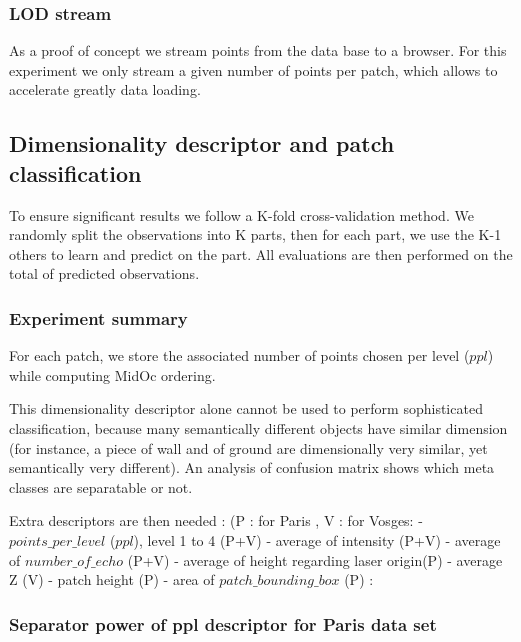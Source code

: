				
		\subsubsection{LOD stream}
			As a proof of concept we stream points from the data base to a browser\cite{IGN2014a}.
			For this experiment we only stream a given number of points per patch, which allows to accelerate greatly data loading. 
			
	\subsection{Dimensionality descriptor and patch classification}
			To ensure significant results we follow a K-fold cross-validation method. 
			We randomly split the observations into K parts, then for each part, we use the K-1 others to learn and predict on the part.
			All evaluations are then performed on the total of predicted observations.
		\subsubsection{Experiment summary}
			For each patch, we store the associated number of points chosen per level ($ppl$) while computing MidOc ordering.  
			
			This dimensionality descriptor alone cannot be used to perform sophisticated classification, because many semantically different objects have similar dimension (for instance, a piece of wall and of ground are dimensionally very similar, yet semantically very different).
			An analysis of confusion matrix shows which meta classes are separatable or not.
			
			Extra descriptors are then needed :  (P : for Paris , V : for Vosges: 
			  - $points\_per\_level$ ($ppl$), level 1 to 4 (P+V)
			  - average of intensity (P+V)
			  - average of $number\_of\_echo$ (P+V)
			  - average of height regarding laser origin(P)
			  - average Z (V)
			  - patch height (P)
			  - area of $patch\_bounding\_box$ (P) : 
		
		\subsubsection{Separator power of ppl descriptor for Paris data set}
			
			
